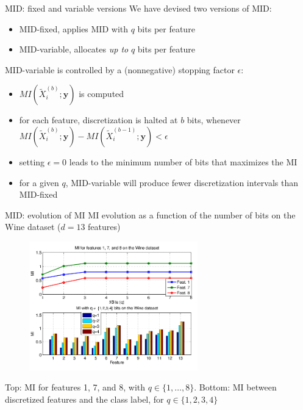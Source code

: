 \documentclass{beamer}
\begin{document}
\begin{frame}{MID: fixed and variable versions}
We have devised two versions of MID:
\begin{itemize}
	\item MID-fixed, applies MID with $q$ bits per feature
	\item MID-variable, allocates \emph{up to} $q$ bits per feature
\end{itemize} 

\vfill
MID-variable is controlled by a 
(nonnegative) stopping factor $\epsilon$:
\begin{itemize}
	\vfill
	\item $MI(\widetilde{X}_i^{(b)};\mathbf{y})$ is computed
		
	\vfill
	\item for each feature, discretization is halted at $b$ bits, whenever
	$MI(\widetilde{X}_i^{(b)};\mathbf{y}) - MI(\widetilde{X}_i^{(b-1)};\mathbf{y}) < \epsilon$
	
	\vfill
	\item setting $\epsilon=0$ leads to the minimum number of bits that maximizes the MI
	
	\vfill
	\item for a given $q$, MID-variable will produce
fewer discretization intervals than MID-fixed
\end{itemize}
\end{frame}


\begin{frame}{MID: evolution of MI}
MI evolution as a function of the number of bits on the Wine dataset ($d=13$ features)
\begin{figure}
	\centering
	\includegraphics[width=0.65\textwidth]{fig3.png}
\end{figure}
{\small Top: MI for features 1, 7, and 8, with $q \in \{1,\ldots,8\}$.
  Bottom: MI between discretized features and the class label, for $q \in \{1,2,3,4\}$}
\end{frame}
\end{document}
